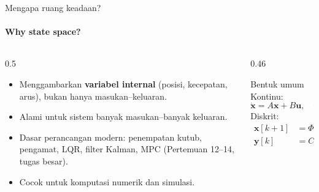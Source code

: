 \documentclass[aspectratio=169,10pt]{beamer}
\begin{document}
\begin{frame}{Mengapa ruang keadaan?}
	\framesubtitle{Why state space?}
	\begin{columns}[T]
		\begin{column}{0.5\textwidth}
			\begin{itemize}
				\item Menggambarkan \textbf{variabel internal} (posisi, kecepatan, arus), bukan hanya masukan--keluaran.
				\item Alami untuk sistem banyak masukan--banyak keluaran.
				\item Dasar perancangan modern: penempatan kutub, pengamat, LQR, filter Kalman, MPC (Pertemuan 12--14, tugas besar).
				\item Cocok untuk komputasi numerik dan simulasi.
			\end{itemize}
		\end{column}
		\begin{column}{0.46\textwidth}
			\begin{block}{Bentuk umum}
				\small
				Kontinu:
				\[
					\dot{\mathbf{x}} = A\mathbf{x} + B\mathbf{u},\quad \mathbf{y} = C\mathbf{x} + D\mathbf{u}
				\]
				Diskrit:
				\begin{align*}
					\mathbf{x}[k+1] &= \Phi\mathbf{x}[k] + \Gamma\mathbf{u}[k]\\
					\mathbf{y}[k] &= C\mathbf{x}[k] + D\mathbf{u}[k]
				\end{align*}
			\end{block}
		\end{column}
	\end{columns}
\end{frame}
\end{document}

